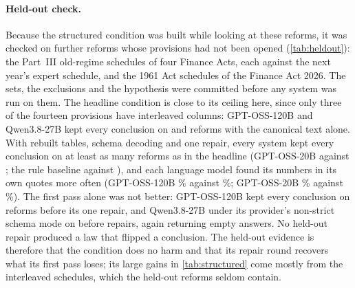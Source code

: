 \documentclass[sn-apa]{sn-jnl}
\begin{document}
\paragraph{Held-out check.} Because the structured condition was built
while looking at these reforms, it was checked on  further
reforms whose provisions had not been opened (\cref{tab:heldout}): the
Part~III old-regime schedules of four Finance Acts, each against the next
year's expert schedule, and the 1961 Act schedules of the Finance Act 2026.
The sets, the exclusions and the hypothesis were committed before any
system was run on them. The headline condition is close to its ceiling
here, since only three of the fourteen provisions have interleaved columns:
GPT-OSS-120B and Qwen3.8-27B kept every conclusion on
 and 
reforms with the canonical text alone. With rebuilt tables, schema decoding
and one repair, every system kept every conclusion on at least as many
reforms as in the headline (GPT-OSS-20B 
against ; the rule baseline
 against ), and each
language model found its numbers in its own quotes more often (GPT-OSS-120B
\% against
\%; GPT-OSS-20B
\% against
\%). The first pass alone was not
better: GPT-OSS-120B kept every conclusion on
 reforms before its one repair, and
Qwen3.8-27B under its provider's non-strict schema mode on
 before 
repairs, again returning empty answers. No held-out repair produced a law
that flipped a conclusion. The held-out evidence is therefore that the
condition does no harm and that its repair round recovers what its first
pass loses; its large gains in \cref{tab:structured} come mostly from the
interleaved schedules, which the held-out reforms seldom contain.

\end{document}

